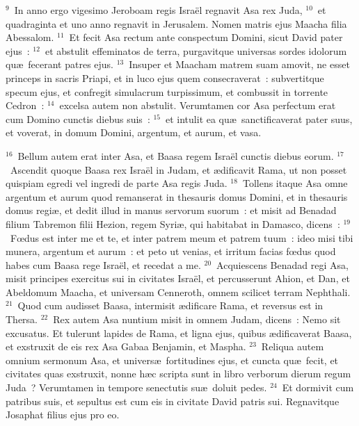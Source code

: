 ${}^{9}$~In anno ergo vigesimo Jeroboam regis Isra\"el regnavit Asa rex Juda,
${}^{10}$~et quadraginta et uno anno regnavit in Jerusalem. Nomen matris ejus Maacha filia Abessalom.
${}^{11}$~Et fecit Asa rectum ante conspectum Domini, sicut David pater ejus~:
${}^{12}$~et abstulit effeminatos de terra, purgavitque universas sordes idolorum qu\ae\ fecerant patres ejus.
${}^{13}$~Insuper et Maacham matrem suam amovit, ne esset princeps in sacris Priapi, et in luco ejus quem consecraverat~: subvertitque specum ejus, et confregit simulacrum turpissimum, et combussit in torrente Cedron~:
${}^{14}$~excelsa autem non abstulit. Verumtamen cor Asa perfectum erat cum Domino cunctis diebus suis~:
${}^{15}$~et intulit ea qu\ae\ sanctificaverat pater suus, et voverat, in domum Domini, argentum, et aurum, et vasa.


${}^{16}$~Bellum autem erat inter Asa, et Baasa regem Isra\"el cunctis diebus eorum.
${}^{17}$~Ascendit quoque Baasa rex Isra\"el in Judam, et \ae dificavit Rama, ut non posset quispiam egredi vel ingredi de parte Asa regis Juda.
${}^{18}$~Tollens itaque Asa omne argentum et aurum quod remanserat in thesauris domus Domini, et in thesauris domus regi\ae , et dedit illud in manus servorum suorum~: et misit ad Benadad filium Tabremon filii Hezion, regem Syri\ae , qui habitabat in Damasco, dicens~:
${}^{19}$~Fœdus est inter me et te, et inter patrem meum et patrem tuum~: ideo misi tibi munera, argentum et aurum~: et peto ut venias, et irritum facias fœdus quod habes cum Baasa rege Isra\"el, et recedat a me.
${}^{20}$~Acquiescens Benadad regi Asa, misit principes exercitus sui in civitates Isra\"el, et percusserunt Ahion, et Dan, et Abeldomum Maacha, et universam Cenneroth, omnem scilicet terram Nephthali.
${}^{21}$~Quod cum audisset Baasa, intermisit \ae dificare Rama, et reversus est in Thersa.
${}^{22}$~Rex autem Asa nuntium misit in omnem Judam, dicens~: Nemo sit excusatus. Et tulerunt lapides de Rama, et ligna ejus, quibus \ae dificaverat Baasa, et exstruxit de eis rex Asa Gabaa Benjamin, et Maspha.
${}^{23}$~Reliqua autem omnium sermonum Asa, et univers\ae\ fortitudines ejus, et cuncta qu\ae\ fecit, et civitates quas exstruxit, nonne h\ae c scripta sunt in libro verborum dierum regum Juda~? Verumtamen in tempore senectutis su\ae\ doluit pedes.
${}^{24}$~Et dormivit cum patribus suis, et sepultus est cum eis in civitate David patris sui. Regnavitque Josaphat filius ejus pro eo.


